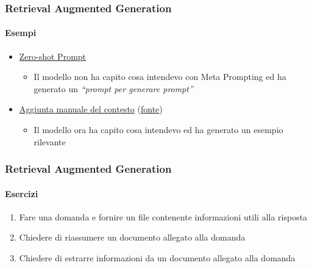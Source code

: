 \begin{exampleframe}
    \frametitle{Retrieval Augmented Generation}
    \framesubtitle{Esempi}

    \begin{itemize}
        \item \href{https://chatgpt.com/share/67769fb3-be30-8003-8ec1-74ecf8c9ad2d}{Zero-shot Prompt}
        \begin{itemize}
            \item Il modello non ha capito cosa intendevo con Meta Prompting ed ha generato un \textit{``prompt per generare prompt''}
        \end{itemize}
        \item \href{https://chatgpt.com/share/6776a11e-da24-8003-92ad-b574ebc8788a}{Aggiunta manuale del contesto} (\href{https://www.promptingguide.ai/techniques/meta-prompting}{fonte})
        \begin{itemize}
            \item Il modello ora ha capito cosa intendevo ed ha generato un esempio rilevante
        \end{itemize}
    \end{itemize}
\end{exampleframe}

\begin{exerciseframe}
    \frametitle{Retrieval Augmented Generation}
    \framesubtitle{Esercizi}

    \begin{enumerate}
        \item Fare una domanda e fornire un file contenente informazioni utili alla risposta

        \bigskip
        \item Chiedere di riassumere un documento allegato alla domanda

        \bigskip
        \item Chiedere di estrarre informazioni da un documento allegato alla domanda
    \end{enumerate}
\end{exerciseframe}